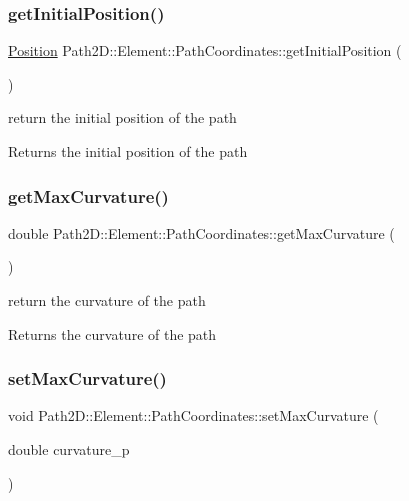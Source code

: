 \subsubsection{\texorpdfstring{get\+Initial\+Position()}{getInitialPosition()}}
{\footnotesize\ttfamily \mbox{\hyperlink{class_path2_d_1_1_element_1_1_position}{Position}} Path2\+D\+::\+Element\+::\+Path\+Coordinates\+::get\+Initial\+Position (\begin{DoxyParamCaption}{ }\end{DoxyParamCaption})}



return the initial position of the path 

\begin{DoxyReturn}{Returns}
the initial position of the path 
\end{DoxyReturn}
\mbox{\label{class_path2_d_1_1_element_1_1_path_coordinates_a0af78108850ec2152b187cb18f48cb2b}} 
\subsubsection{\texorpdfstring{get\+Max\+Curvature()}{getMaxCurvature()}}
{\footnotesize\ttfamily double Path2\+D\+::\+Element\+::\+Path\+Coordinates\+::get\+Max\+Curvature (\begin{DoxyParamCaption}{ }\end{DoxyParamCaption})}



return the curvature of the path 

\begin{DoxyReturn}{Returns}
the curvature of the path 
\end{DoxyReturn}
\mbox{\label{class_path2_d_1_1_element_1_1_path_coordinates_a35528f5a799aadeaf6b1c5b04459af5b}} 
\subsubsection{\texorpdfstring{set\+Max\+Curvature()}{setMaxCurvature()}}
{\footnotesize\ttfamily void Path2\+D\+::\+Element\+::\+Path\+Coordinates\+::set\+Max\+Curvature (\begin{DoxyParamCaption}\item[{double}]{curvature\+\_\+p }\end{DoxyParamCaption})}



